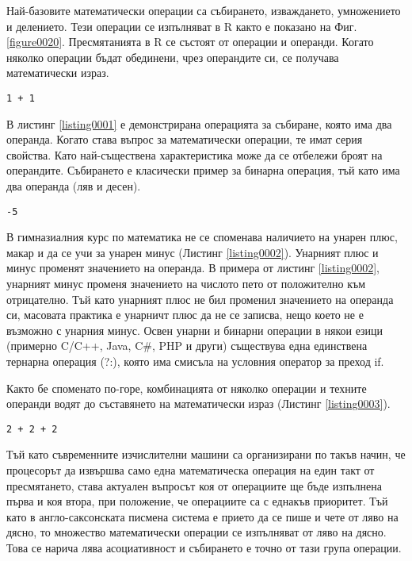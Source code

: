 Най-базовите математически операции са събирането, изваждането, умножението и делението. Тези операции се изпълняват в R както е показано на Фиг. \ref{figure0020}. Пресмятанията в R се състоят от операции и операнди. Когато няколко операции бъдат обединени, чрез операндите си, се получава математически израз. 

\begin{lstlisting}[caption=Събиране, label=listing0001]
1 + 1
\end{lstlisting}

В листинг \ref{listing0001} е демонстрирана операцията за събиране, която има два операнда. Когато става въпрос за математически операции, те имат серия свойства. Като най-съществена характеристика може да се отбележи броят на операндите. Събирането е класически пример за бинарна операция, тъй като има два операнда (ляв и десен). 

\begin{lstlisting}[caption=Унарен минус, label=listing0002]
-5
\end{lstlisting}

В гимназиалния курс по математика не се споменава наличието на унарен плюс, макар и да се учи за унарен минус (Листинг \ref{listing0002}). Унарният плюс и минус променят значението на операнда. В примера от листинг \ref{listing0002}, унарният минус променя значението на числото пето от положително към отрицателно. Тъй като унарният плюс не бил променил значението на операнда си, масовата практика е унарничт плюс да не се записва, нещо което не е възможно с унарния минус. Освен унарни и бинарни операции в някои езици (примерно C/C++, Java, C\#, PHP и други) съществува една единствена тернарна операция (?:), която има смисъла на условния оператор за преход if. 

Както бе споменато по-горе, комбинацията от няколко операции и техните операнди водят до съставянето на математически израз (Листинг \ref{listing0003}). 

\begin{lstlisting}[caption=Аритметичен израз с две събирания, label=listing0003]
2 + 2 + 2
\end{lstlisting}

Тъй като съвременните изчислителни машини са организирани по такъв начин, че процесорът да извършва само една математическа операция на един такт от пресмятането, става актуален въпросът коя от операциите ще бъде изпълнена първа и коя втора, при положение, че операциите са с еднакъв приоритет. Тъй като в англо-саксонската писмена система е прието да се пише и чете от ляво на дясно, то множество математически операции се изпълняват от ляво на дясно. Това се нарича лява асоциативност и събирането е точно от тази група операции.

